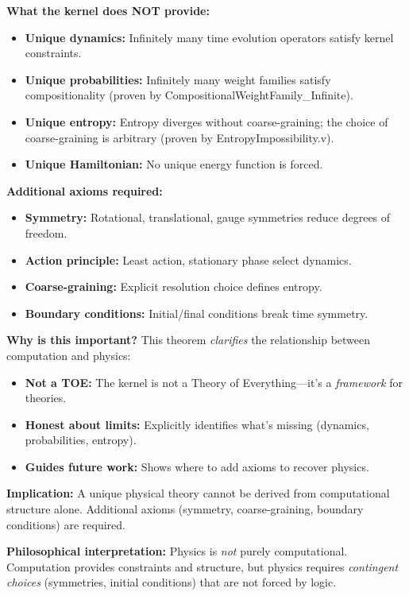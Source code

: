 \textbf{What the kernel does NOT provide:}
\begin{itemize}
    \item \textbf{Unique dynamics:} Infinitely many time evolution operators satisfy kernel constraints.
    \item \textbf{Unique probabilities:} Infinitely many weight families satisfy compositionality (proven by CompositionalWeightFamily\_Infinite).
    \item \textbf{Unique entropy:} Entropy diverges without coarse-graining; the choice of coarse-graining is arbitrary (proven by EntropyImpossibility.v).
    \item \textbf{Unique Hamiltonian:} No unique energy function is forced.
\end{itemize}

\textbf{Additional axioms required:}
\begin{itemize}
    \item \textbf{Symmetry:} Rotational, translational, gauge symmetries reduce degrees of freedom.
    \item \textbf{Action principle:} Least action, stationary phase select dynamics.
    \item \textbf{Coarse-graining:} Explicit resolution choice defines entropy.
    \item \textbf{Boundary conditions:} Initial/final conditions break time symmetry.
\end{itemize}

\textbf{Why is this important?} This theorem \textit{clarifies} the relationship between computation and physics:
\begin{itemize}
    \item \textbf{Not a TOE:} The kernel is not a Theory of Everything---it's a \textit{framework} for theories.
    \item \textbf{Honest about limits:} Explicitly identifies what's missing (dynamics, probabilities, entropy).
    \item \textbf{Guides future work:} Shows where to add axioms to recover physics.
\end{itemize}

\textbf{Implication:} A unique physical theory cannot be derived from computational structure alone. Additional axioms (symmetry, coarse-graining, boundary conditions) are required.

\textbf{Philosophical interpretation:} Physics is \textit{not} purely computational. Computation provides constraints and structure, but physics requires \textit{contingent choices} (symmetries, initial conditions) that are not forced by logic.


